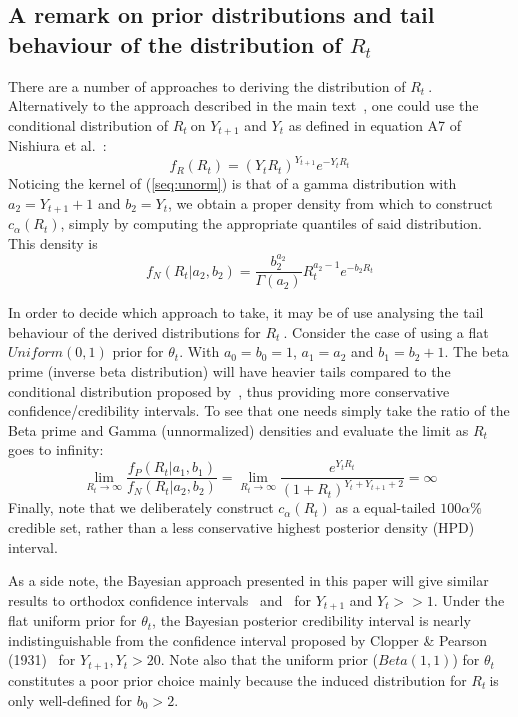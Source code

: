 \documentclass[10pt]{article}
\def \rr {$R_{t}\:$}
\begin{document}
\subsection*{A remark on prior distributions and tail behaviour of the 
distribution of $R_t$}
\label{sec:tails}
There are a number of approaches to deriving the distribution of \rr.
Alternatively to the approach described in the main text~\cite{mantel}, one 
could use the conditional distribution of \rr on 
$Y_{t+1}$ and $Y_t$ as defined in equation A7 of Nishiura et 
al.~\cite{nishiura}:
\begin{equation}
\label{seq:unorm}
f_{R}(R_{t}) = (Y_tR_{t})^{Y_{t+1}} e^{-Y_tR_{t}}
\end{equation}
Noticing the kernel of (\ref{seq:unorm}) is that of a gamma distribution with 
$a_2 = Y_{t+1}+1$ and $b_2 = Y_t$, we obtain a proper density from which to 
construct $c_{\alpha}(R_t)$, simply by computing the appropriate quantiles of 
said distribution.
 This density is
\begin{equation}
\label{seq:densityNishiura}
f_N(R_t| a_2, b_2) =  \frac{b_2^{a_2}}{\Gamma(a_2)} R_t^{a_2-1} e^{-b_2 R_t}
\end{equation}

In order to decide which approach to take, it may be of use analysing the 
tail behaviour of the derived distributions for \rr. 
Consider the case of using a flat $Uniform(0, 1)$ prior for $\theta_t$.
With $a_0 = b_0 = 1$, $a_1 = a_2$ and $b_1 = b_2 + 1$.
The beta prime (inverse beta distribution) will have heavier tails compared to 
the conditional distribution proposed by~\cite{nishiura}, thus providing more 
conservative confidence/credibility intervals.
To see that one needs simply take the ratio of the Beta prime and Gamma 
(unnormalized) densities and evaluate the limit as $R_t$ goes to infinity:
\begin{equation}
 \label{seq:densityratio}
 \lim_{R_t\to\infty}\frac{f_P(R_t| a_1, b_1)}{f_N(R_t| a_2, b_2)} =  
\lim_{R_t\to\infty}\frac{e^{Y_{t}R_t}}{(1 +R_t)^{Y_{t} + Y_{t +1}+2}} = \infty
\end{equation}
Finally, note that we deliberately construct $c_{\alpha}(R_{t})$ as a 
equal-tailed $100\alpha\%$ credible set, rather than a less conservative 
highest posterior density (HPD) interval.

As a side note, the Bayesian approach presented in this 
paper will give similar results to orthodox confidence intervals~\cite{wilson} 
and~\cite{clopper} for $Y_{t+1}$ and $Y_t >> 1$.
Under the flat  uniform prior for $\theta_t$, the Bayesian posterior 
credibility 
interval is nearly indistinguishable from the confidence interval proposed by 
Clopper \& Pearson (1931)~\cite{clopper} for $Y_{t+1}, Y_t > 20$.
Note also that the uniform prior ($Beta(1, 1)$) for $\theta_t$ constitutes a 
poor 
prior 
choice mainly because the induced distribution for \rr is only well-defined for 
$b_0 > 2$.
\end{document}
